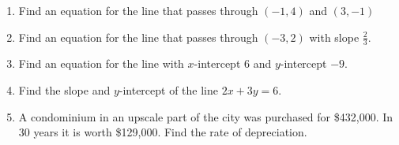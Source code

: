 \documentclass[11pt]{article}
\begin{document}
\begin{enumerate}
\item Find an equation for the line that passes through $(-1,4)$ and $(3,-1)$ \vfill
\item Find an equation for the line that passes through $(-3,2)$ with slope $\tfrac{2}{3}$. \vfill
\item Find an equation for the line with $x$-intercept 6 and $y$-intercept $-9$. \vfill

\item Find the slope and $y$-intercept of the line $2x + 3y = 6$. \vfill

\item A condominium in an upscale part of the city was purchased for \$432,000. In 30 years it is worth \$129,000. Find the rate of depreciation.
\setcounter{enumCount}{\theenumi}
\end{enumerate}
\vfill
\end{document}
